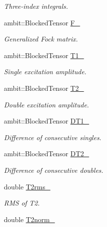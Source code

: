 \begin{DoxyCompactItemize}
\begin{DoxyCompactList}\small\item\em Three-\/index integrals. \end{DoxyCompactList}\item 
ambit\+::\+Blocked\+Tensor \mbox{\hyperlink{classforte_1_1_s_a___m_r_d_s_r_g_adef826a12efd7d5fc90c0fa5f1c8aa16}{F\+\_\+}}
\begin{DoxyCompactList}\small\item\em Generalized Fock matrix. \end{DoxyCompactList}\item 
ambit\+::\+Blocked\+Tensor \mbox{\hyperlink{classforte_1_1_s_a___m_r_d_s_r_g_ab1ef8af886dc13bc8db81a12fe348c18}{T1\+\_\+}}
\begin{DoxyCompactList}\small\item\em Single excitation amplitude. \end{DoxyCompactList}\item 
ambit\+::\+Blocked\+Tensor \mbox{\hyperlink{classforte_1_1_s_a___m_r_d_s_r_g_a5d18b864c3f7321e8ae27990237652a9}{T2\+\_\+}}
\begin{DoxyCompactList}\small\item\em Double excitation amplitude. \end{DoxyCompactList}\item 
ambit\+::\+Blocked\+Tensor \mbox{\hyperlink{classforte_1_1_s_a___m_r_d_s_r_g_afd30aefcb508c8a99c959a60d3b04021}{D\+T1\+\_\+}}
\begin{DoxyCompactList}\small\item\em Difference of consecutive singles. \end{DoxyCompactList}\item 
ambit\+::\+Blocked\+Tensor \mbox{\hyperlink{classforte_1_1_s_a___m_r_d_s_r_g_a46b18fd1c7a56e5b5c1fab67d5938cc7}{D\+T2\+\_\+}}
\begin{DoxyCompactList}\small\item\em Difference of consecutive doubles. \end{DoxyCompactList}\item 
double \mbox{\hyperlink{classforte_1_1_s_a___m_r_d_s_r_g_ae11f41c3599c645d263e074444f870fa}{T2rms\+\_\+}}
\begin{DoxyCompactList}\small\item\em R\+MS of T2. \end{DoxyCompactList}\item 
double \mbox{\hyperlink{classforte_1_1_s_a___m_r_d_s_r_g_aec4f2d0624188b561d67104c28553f95}{T2norm\+\_\+}}

\end{DoxyCompactItemize}
